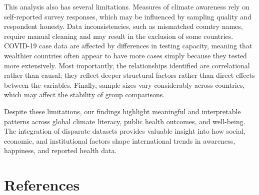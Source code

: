 \documentclass[
]{article}
\begin{document}
This analysis also has several limitations. Measures of climate awareness rely on self-reported survey responses, which may be influenced by sampling quality and respondent honesty. Data inconsistencies, such as mismatched country names, require manual cleaning and may result in the exclusion of some countries. COVID-19 case data are affected by differences in testing capacity, meaning that wealthier countries often appear to have more cases simply because they tested more extensively. Most importantly, the relationships identified are correlational rather than causal; they reflect deeper structural factors rather than direct effects between the variables. Finally, sample sizes vary considerably across countries, which may affect the stability of group comparisons.

Despite these limitations, our findings highlight meaningful and interpretable patterns across global climate literacy, public health outcomes, and well-being. The integration of disparate datasets provides valuable insight into how social, economic, and institutional factors shape international trends in awareness, happiness, and reported health data.

\section{References}\label{references}
\end{document}

